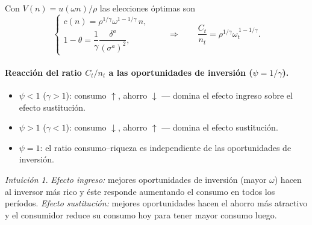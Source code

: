 \documentclass[11pt]{article}
\theoremstyle{definition}
\theoremstyle{remark}
\newtheorem*{intuicion}{Intuición}
\begin{document}
Con $V(n)=u(\omega n)/\rho$ las elecciones óptimas son
\[
\begin{cases}
c(n)=\rho^{1/\gamma}\omega^{1-1/\gamma}\,n,\\[3pt]
1-\theta=\dfrac{1}{\gamma}\dfrac{\delta^{a}}{(\sigma^{a})^2},
\end{cases}
\qquad\Longrightarrow\qquad
\frac{C_t}{n_t}=\rho^{1/\gamma}\omega_t^{\,1-1/\gamma}.
\]

\paragraph{Reacción del ratio $C_t/n_t$ a las oportunidades de inversión ($\psi=1/\gamma$).}
\begin{itemize}[leftmargin=2.2em]
\item $\psi<1$ ($\gamma>1$): consumo $\uparrow$, ahorro $\downarrow$ — domina el efecto ingreso sobre el efecto sustitución.
\item $\psi>1$ ($\gamma<1$): consumo $\downarrow$, ahorro $\uparrow$ — domina el efecto sustitución.
\item $\psi=1$: el ratio consumo--riqueza es independiente de las oportunidades de inversión.
\end{itemize}

\begin{intuicion}
\emph{Efecto ingreso:} mejores oportunidades de inversión (mayor $\omega$) hacen al inversor más rico y éste responde aumentando el consumo en todos los períodos.
\emph{Efecto sustitución:} mejores oportunidades hacen el ahorro más atractivo y el consumidor reduce su consumo hoy para tener mayor consumo luego.
\end{intuicion}
\end{document}
